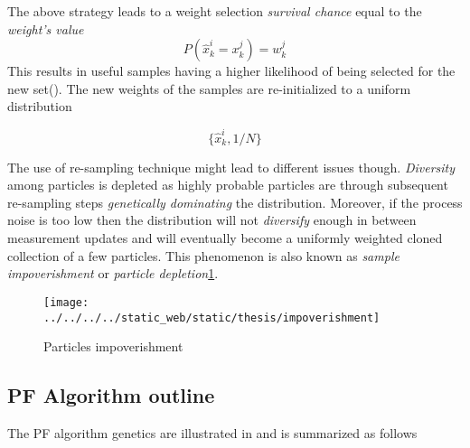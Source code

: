 The above strategy leads to a weight selection \emph{survival chance} equal to the \emph{weight's value}
$$P(\hat{x}_k^i = x_k^j) = w_k^j$$ This results in useful samples having a higher likelihood of being selected for the new set(). The new weights of the samples are re-initialized to a uniform distribution

\begin{equation}\label{eq:normalize2CSW}
	\{\hat{x}_k^i , 1/N\}
\end{equation}



The use of re-sampling technique might lead to different issues though. \emph{Diversity} among particles is depleted as highly probable particles are through subsequent re-sampling steps \emph{genetically dominating} the distribution. Moreover, if the process noise is too low then the distribution will not \emph{diversify} enough in between measurement updates and will eventually become a uniformly weighted cloned collection of a few particles. This phenomenon is also known as \emph{sample impoverishment} or \emph{particle depletion}\ref{fig:impoverishment}\cite{Chatzi2002}.

\begin{figure}[H]
	\centering
	\texttt{[image: ../../../../static\_web/static/thesis/impoverishment]}
	\caption{Particles impoverishment\cite{Ju2019}}
	\label{fig:impoverishment}
\end{figure}


\subsection{PF Algorithm outline}


The PF algorithm genetics are illustrated in  and is summarized as follows

